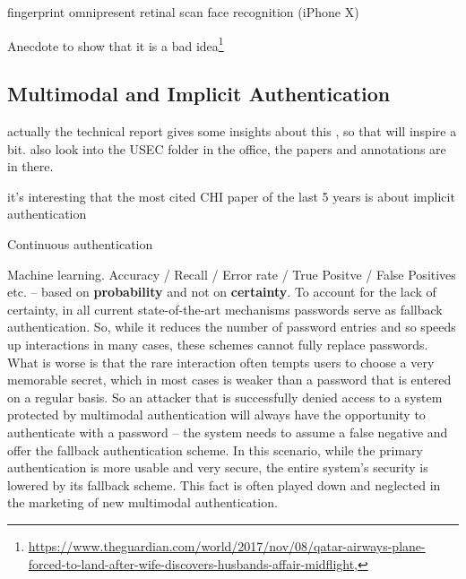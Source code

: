 	\cite{Jakobsson2014HowToWearYourPW,DeLuca2012TouchMeOnce,Peisert2013PriciplesAuthentication,Rybnicek2014RoadmapContinuousAuth}
	
	\cite{Chiasson2009InterferencesGraphical}
	
	\cite{Katsini2017StrategiesGraphicalPasswords}

	fingerprint omnipresent 
	retinal scan
	face recognition (iPhone X)
	
	
	Anecdote to show that it is a bad idea\footnote{\url{https://www.theguardian.com/world/2017/nov/08/qatar-airways-plane-forced-to-land-after-wife-discovers-husbands-affair-midflight}, }
	
	\subsection{Multimodal and Implicit Authentication}
	
	actually the technical report gives some insights about this \cite{Stockinger2011ImplicitAuthentication}, so that will inspire a bit.
	also look into the USEC folder in the office, the papers and annotations are in there.
	
		it's interesting that the most cited CHI paper of the last 5 years is about implicit authentication \cite{DeLuca2012TouchMeOnce}
		
		\cite{Roalter2013SmartphoneProxy}
		
		Continuous authentication \cite{Peisert2013PriciplesAuthentication}
	
	Machine learning. Accuracy / Recall / Error rate / True Positve / False Positives etc. -- based on \textbf{probability} and not on \textbf{certainty}. To account for the lack of certainty, in all current state-of-the-art mechanisms passwords serve as fallback authentication. So, while it reduces the number of password entries and so speeds up interactions in many cases, these schemes cannot fully replace passwords. What is worse is that the rare interaction often tempts users to choose a very memorable secret, which in most cases is weaker than a password that is entered on a regular basis. So an attacker that is successfully denied access to a system protected by multimodal authentication will always have the opportunity to authenticate with a password -- the system needs to assume a false negative and offer the fallback authentication scheme. In this scenario, while the primary authentication is more usable and very secure, the entire system's security is lowered by its fallback scheme. This fact is often played down and neglected in the marketing of new multimodal authentication. 
	
